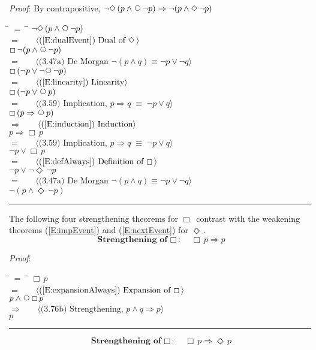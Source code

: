 \documentclass[12pt, fleqn, leqno]{article}
\newcommand{\lgap}{2pt}                             %
\newcommand{\mymathindent}{24pt}                    %
\newcommand{\equivs}{\ensuremath{\;\equiv\;}}       %
\newcommand{\impl}{\ensuremath{\Rightarrow}}        %
\newcommand{\Next}{\;\,\text{\raisebox{3.5pt}{\circle{6}}}}
\newcommand{\Event}{\Diamond\,}
\newcommand{\Always}{\Box\,}
\newcommand{\myqed}{\rule[-.23ex]{1.2ex}{2.0ex}}
\newcommand{\myqedtab}{\hspace{384pt}}              %
\newcommand{\Gll} {\langle}                         %
\newcommand{\Ggg} {\rangle}                         %
\newcommand{\Hint}[1]     {\ \ \ $\Gll              \mbox{#1} \Ggg$ }   %
\begin{document}
\emph{Proof}: By contrapositive, $\neg\Event(p\land\Next\neg p)\impl\neg(p\land \Event\neg p)$
\begin{tabbing}
\hspace{\mymathindent} \= $= \;$ \= \myqedtab \= \kill
  \> \>   $\neg\Event(p\land\Next\neg p)$\\[\lgap]
  \> $=$  \>  \Hint{(\ref{E:dualEvent}) Dual of $\Event$}\\[\lgap]
  \> \>   $\Always\neg(p\land\Next\neg p)$\\[\lgap]
  \> $=$  \>  \Hint{(3.47a) De Morgan $\neg (p \land q) \equiv \neg p \lor \neg q$}\\[\lgap]
  \> \>   $\Always(\neg p\lor\neg\Next\neg p)$\\[\lgap]
  \> $=$  \>  \Hint{(\ref{E:linearity}) Linearity}\\[\lgap]
  \> \>   $\Always(\neg p\lor\Next p)$\\[\lgap]
  \> $=$  \>  \Hint{(3.59) Implication, $p\impl q \equivs \neg p \lor q$}\\[\lgap]
  \> \>   $\Always(p\impl\Next p)$\\[\lgap]
  \> $\impl$  \>  \Hint{(\ref{E:induction}) Induction}\\[\lgap]
  \> \>   $p\impl\Always p$\\[\lgap]
  \> $=$  \>  \Hint{(3.59) Implication, $p\impl q \equivs \neg p \lor q$}\\[\lgap]
  \> \>   $\neg p\lor\Always p$\\[\lgap]
  \> $=$  \>  \Hint{(\ref{E:defAlways}) Definition of $\Always$}\\[\lgap]
  \> \>   $\neg p\lor\neg\Event\neg p$\\[\lgap]
  \> $=$  \>  \Hint{(3.47a) De Morgan $\neg (p \land q) \equiv \neg p \lor \neg q$}\\[\lgap]
  \> \>   $\neg(p\land \Event\neg p)$ \quad \myqed
\end{tabbing}

The following four strengthening theorems for $\Always$ contrast with the weakening theorems
(\ref{E:impEvent}) and (\ref{E:nextEvent})
for $\Event$.
\begin{equation}\label{E:impAlways}
\textbf{Strengthening of $\Always$:}\quad \Always p \impl p
\end{equation}

\emph{Proof}:
\begin{tabbing}
\hspace{\mymathindent} \= $= \;$ \= \myqedtab \= \kill
  \> \>   $\Always p$\\[\lgap]
  \> $=$  \>  \Hint{(\ref{E:expansionAlways}) Expansion of $\Always$}\\[\lgap]
  \> \>   $p \land \Next\Always p$\\[\lgap]
  \> $\impl$  \>  \Hint{(3.76b) Strengthening, $p\land q \impl p$}\\[\lgap]
  \> \>   $p$ \quad \myqed
\end{tabbing}
\begin{equation}\label{E:impAlwaysE}
\textbf{Strengthening of $\Always$:}\quad \Always p \impl \Event p
\end{equation}
\end{document}
